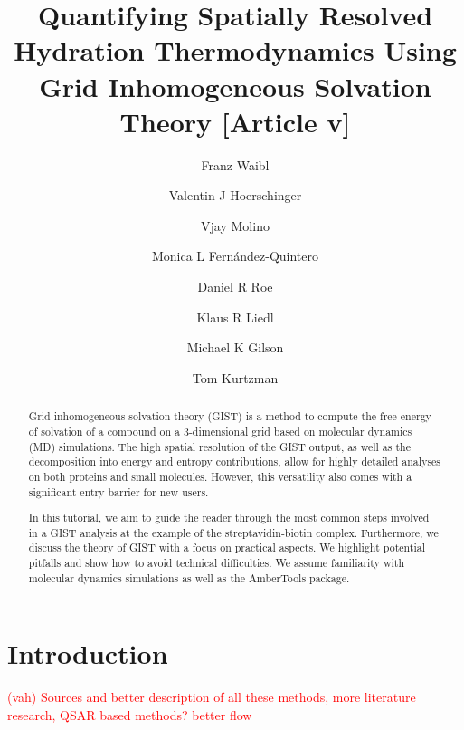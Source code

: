 \documentclass[9pt,tutorial]{livecoms}
\title{Quantifying Spatially Resolved Hydration Thermodynamics Using Grid Inhomogeneous Solvation Theory [Article v\versionnumber]}
\author[1\authfn{1}]{Franz Waibl}
\author[1\authfn{1}]{Valentin J Hoerschinger}
\author[2]{Vjay Molino}
\author[1]{Monica L Fern{\'a}ndez-Quintero}
\author[4]{Daniel R Roe}
\author[1*]{Klaus R Liedl}
\author[2*]{Michael K Gilson}
\author[2*]{Tom Kurtzman}
\affil[1]{Department of General, Inorganic and Theoretical Chemistry, University of Innsbruck, Austria}
\affil[2]{Institution 2}
\newcommand{\todo}{\textcolor{red}}
\begin{document}
\begin{frontmatter}
\maketitle

\begin{abstract}
Grid inhomogeneous solvation theory (GIST) is a method to compute the free energy of solvation of a compound on a 3-dimensional grid based on molecular dynamics (MD) simulations.
The high spatial resolution of the GIST output, as well as the decomposition into energy and entropy contributions, allow for highly detailed analyses on both proteins and small molecules. However, this versatility also comes with a significant entry barrier for new users.

In this tutorial, we aim to guide the reader through the most common steps involved in a GIST analysis at the example of the streptavidin-biotin complex.
Furthermore, we discuss the theory of GIST with a focus on practical aspects.
We highlight potential pitfalls and show how to avoid technical difficulties.
We assume familiarity with molecular dynamics simulations as well as the AmberTools package.

%
\end{abstract}

\end{frontmatter}




\section{Introduction}
\todo{ (vah) Sources and better description of all these methods, more literature research, QSAR based methods? better flow }
\end{document}
